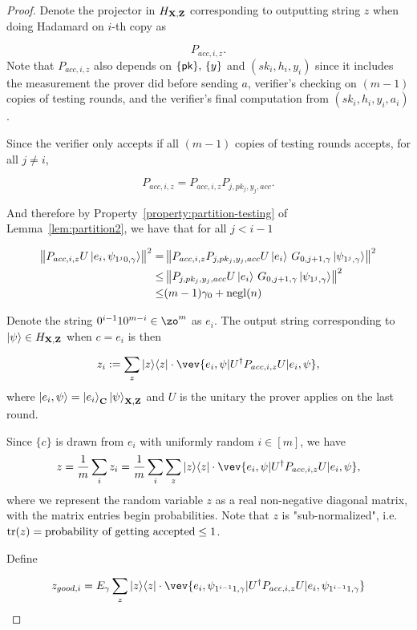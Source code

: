 \begin{proof}
Denote the projector in $H_{\mathbf{X},\mathbf{Z}}$ corresponding to outputting string $z$ when doing Hadamard on $i$-th copy as

$$P_{acc,i,z}.$$
Note that $P_{acc,i,z}$ also depends on $\{\mathsf{pk}\},\,\{y\}$ and  $(sk_i,h_i,y_i)$ since it includes the measurement the prover did before sending $a$,  verifier's checking on $(m-1)$ copies of testing rounds, and  the verifier's final computation from $(sk_i,h_i,y_i,a_i)$.

Since the verifier only accepts if all $(m-1)$ copies of testing rounds accepts, for all $j\neq i$,

$$P_{acc,i,z}=P_{acc,i,z}P_{j,pk_j,y_j,acc}.$$

And therefore by Property~\ref{property:partition-testing} of Lemma~\ref{lem:partition2}, we have that for all $j <i-1$

\begin{align} \label{eq:rejected-d}
    \left\lVert P_{acc,i,z} U \ket{e_i, \psi_{1^j0,\gamma}}\right\rVert^2
    =& \left\lVert P_{acc,i,z}P_{j,pk_j,y_j,acc} U \ket{e_i}\, G_{0,j+1,\gamma}\ket{\psi_{1^j,\gamma}}  \right\rVert^2 \nonumber \\
    \leq& \left\lVert P_{j,pk_j,y_j,acc} U \ket{e_i}\, G_{0,j+1,\gamma}\ket{\psi_{1^j,\gamma}}  \right\rVert^2 \nonumber \\
    \leq& (m-1)\gamma_0+\operatorname{negl}(n) 
\end{align}


Denote the string $0^{i-1}10^{m-i} \in \zo^m $ as $e_i$. The output string corresponding to $\ket{\psi} \in H_{\mathbf{X},\mathbf{Z}}$ when $c=e_i$ is then 




$$z_i\defeq \sum_z \proj{z} \cdot \vev{e_i,\psi|U^\dag P_{acc,i,z} U|e_i,\psi},$$
where $\ket{e_i,\psi}=\ket{e_i}_{\mathbf{C}}\ket{\psi}_{\mathbf{X},\mathbf{Z}}$ and $U$ is the unitary the prover applies on the last round. 

Since $\{c\}$ is drawn  from $e_i$ with uniformly random $i\in [m]$, we have 
$$ z=\frac{1}{m} \sum_i z_i= \frac{1}{m} \sum_i \sum_z \proj{z} \cdot \vev{e_i,\psi|U^\dag P_{acc,i,z} U|e_i,\psi},$$ 
	where we represent the random variable $z$ as a real non-negative diagonal matrix, with the matrix entries begin  probabilities. Note that $z$ is "sub-normalized", i.e. $\operatorname{tr} (z)= \text{probability of getting accepted} \leq 1$.






Define 

\begin{align}
    z_{good,i}=E_\gamma \sum_z \proj{z} \cdot \vev{e_i,\psi_{1^{i-1}1,\gamma}|U^\dag P_{acc,i,z} U|e_i,\psi_{1^{i-1}1,\gamma}}
\end{align}


\end{proof}
